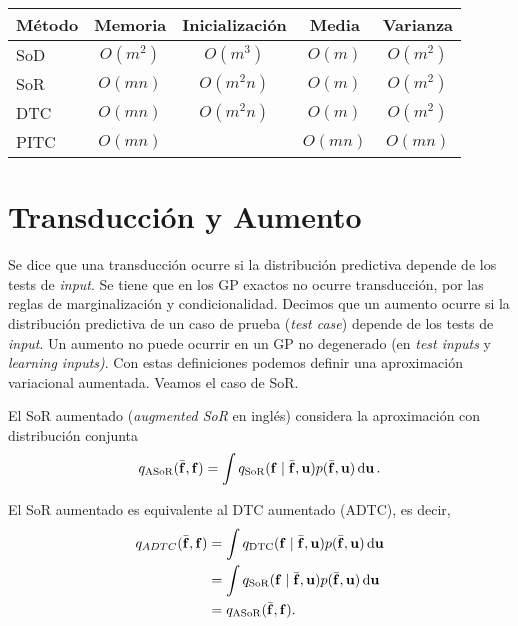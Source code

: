 \begin{table}[h]
	\centering
	\begin{tabular}{|l|c|c|c|c|}
		\hline
		Método	& Memoria		& Inicialización	& Media		& Varianza\\
		\hline
		SoD		& \(O(m^2)\)	& \(O(m^3)\)		& \(O(m)\)	& \(O(m^2)\)\\
		SoR		& \(O(mn)\)		& \(O(m^2 n)\)		& \(O(m)\)	& \(O(m^2)\)\\
		DTC		& \(O(mn)\)		& \(O(m^2 n)\)		& \(O(m)\)	& \(O(m^2)\)\\
		PITC	& \(O(mn)\)		& 					& \(O(mn)\)	& \(O(mn)\)\\
		\hline
	\end{tabular}
\end{table}

\section{Transducción y Aumento}

Se dice que una transducción ocurre si la distribución predictiva depende de los tests de \emph{input}. Se tiene que en los GP exactos no ocurre transducción, por las reglas de marginalización y condicionalidad. Decimos que un aumento ocurre si la distribución predictiva de un caso de prueba (\emph{test case}) depende de los tests de \emph{input}. Un aumento no puede ocurrir en un GP no degenerado (en \emph{test inputs} y \emph{learning inputs)}. Con estas definiciones podemos definir una aproximación variacional aumentada. Veamos el caso de SoR.

\begin{definition}
	El SoR aumentado (\emph{augmented SoR} en inglés) considera la aproximación con distribución conjunta
	\begin{equation*}
	q_{\mathrm{ASoR}}(\bar{\mathbf{f}}, \mathbf{f}) = \int q_{\mathrm{SoR}}(\mathbf{f} \mid \bar{\mathbf{f}}, \mathbf{u}) p(\bar{\mathbf{f}}, \mathbf{u}) \dd{\mathbf{u}}.
	\end{equation*}
\end{definition}

\begin{proposition}
	El SoR aumentado es equivalente al DTC aumentado (ADTC), es decir,
	\begin{align*}
		q_{ADTC}(\bar{\mathbf{f}}, \mathbf{f})	&= \int q_{\mathrm{DTC}}(\mathbf{f} \mid \bar{\mathbf{f}}, \mathbf{u}) p(\bar{\mathbf{f}}, \mathbf{u}) \dd{\mathbf{u}} \\
									&= \int q_{\mathrm{SoR}}(\mathbf{f} \mid \bar{\mathbf{f}}, \mathbf{u}) p(\bar{\mathbf{f}}, \mathbf{u}) \dd{\mathbf{u}} \\
									&= q_{\mathrm{ASoR}}(\bar{\mathbf{f}}, \mathbf{f}).
	\end{align*}
\end{proposition}

